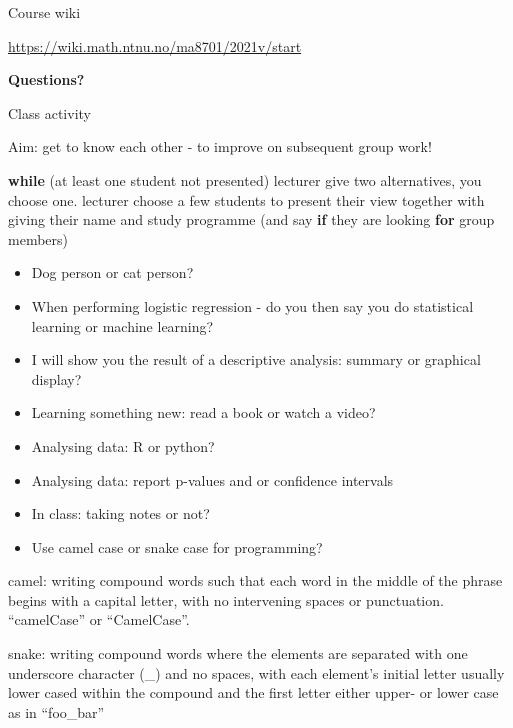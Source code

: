 \documentclass[
  ignorenonframetext,
]{beamer}
\newenvironment{Shaded}{\begin{snugshade}}{\end{snugshade}}
\newcommand{\ControlFlowTok}[1]{\textcolor[rgb]{0.13,0.29,0.53}{\textbf{#1}}}
\newcommand{\NormalTok}[1]{#1}
\providecommand{\tightlist}{%
  \setlength{\itemsep}{0pt}\setlength{\parskip}{0pt}}
\begin{document}
\begin{frame}{Course wiki}
\protect\hypertarget{course-wiki}{}

\url{https://wiki.math.ntnu.no/ma8701/2021v/start}

\textbf{Questions?}

\end{frame}

\begin{frame}[fragile]{Class activity}
\protect\hypertarget{class-activity}{}

Aim: get to know each other - to improve on subsequent group work!

\begin{Shaded}
\begin{Highlighting}[]
\ControlFlowTok{while}\NormalTok{ (at least one student not presented) }
\NormalTok{   lecturer give two alternatives, you choose one. }
\NormalTok{   lecturer choose a few students to present their view }
\NormalTok{   together with giving their name and study programme }
\NormalTok{   (and say }\ControlFlowTok{if}\NormalTok{ they are looking }\ControlFlowTok{for}\NormalTok{ group members)}
\end{Highlighting}
\end{Shaded}

\end{frame}

\begin{frame}

\begin{itemize}
\tightlist
\item
  Dog person or cat person?
\item
  When performing logistic regression - do you then say you do
  statistical learning or machine learning?
\item
  I will show you the result of a descriptive analysis: summary or
  graphical display?
\item
  Learning something new: read a book or watch a video?
\item
  Analysing data: R or python?
\item
  Analysing data: report p-values and or confidence intervals
\item
  In class: taking notes or not?
\item
  Use camel case or snake case for programming?
\end{itemize}

camel: writing compound words such that each word in the middle of the
phrase begins with a capital letter, with no intervening spaces or
punctuation. ``camelCase'' or ``CamelCase''.

snake: writing compound words where the elements are separated with one
underscore character (\_) and no spaces, with each element's initial
letter usually lower cased within the compound and the first letter
either upper- or lower case as in ``foo\_bar''

\end{frame}
\end{document}
